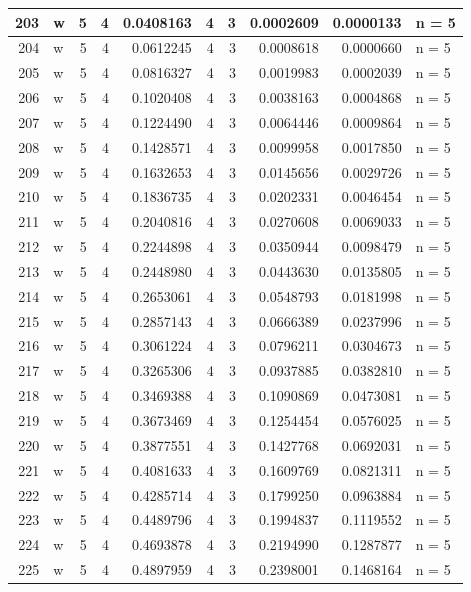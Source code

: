 \documentclass[
  letterpaper,
  DIV=11,
  numbers=noendperiod]{scrreprt}
\begin{document}
\begin{table}
\begin{tabular}[t]{r|l|r|r|r|r|r|r|r|l}
\hline
203 & w & 5 & 4 & 0.0408163 & 4 & 3 & 0.0002609 & 0.0000133 & n = 5\\
\hline
204 & w & 5 & 4 & 0.0612245 & 4 & 3 & 0.0008618 & 0.0000660 & n = 5\\
\hline
205 & w & 5 & 4 & 0.0816327 & 4 & 3 & 0.0019983 & 0.0002039 & n = 5\\
\hline
206 & w & 5 & 4 & 0.1020408 & 4 & 3 & 0.0038163 & 0.0004868 & n = 5\\
\hline
207 & w & 5 & 4 & 0.1224490 & 4 & 3 & 0.0064446 & 0.0009864 & n = 5\\
\hline
208 & w & 5 & 4 & 0.1428571 & 4 & 3 & 0.0099958 & 0.0017850 & n = 5\\
\hline
209 & w & 5 & 4 & 0.1632653 & 4 & 3 & 0.0145656 & 0.0029726 & n = 5\\
\hline
210 & w & 5 & 4 & 0.1836735 & 4 & 3 & 0.0202331 & 0.0046454 & n = 5\\
\hline
211 & w & 5 & 4 & 0.2040816 & 4 & 3 & 0.0270608 & 0.0069033 & n = 5\\
\hline
212 & w & 5 & 4 & 0.2244898 & 4 & 3 & 0.0350944 & 0.0098479 & n = 5\\
\hline
213 & w & 5 & 4 & 0.2448980 & 4 & 3 & 0.0443630 & 0.0135805 & n = 5\\
\hline
214 & w & 5 & 4 & 0.2653061 & 4 & 3 & 0.0548793 & 0.0181998 & n = 5\\
\hline
215 & w & 5 & 4 & 0.2857143 & 4 & 3 & 0.0666389 & 0.0237996 & n = 5\\
\hline
216 & w & 5 & 4 & 0.3061224 & 4 & 3 & 0.0796211 & 0.0304673 & n = 5\\
\hline
217 & w & 5 & 4 & 0.3265306 & 4 & 3 & 0.0937885 & 0.0382810 & n = 5\\
\hline
218 & w & 5 & 4 & 0.3469388 & 4 & 3 & 0.1090869 & 0.0473081 & n = 5\\
\hline
219 & w & 5 & 4 & 0.3673469 & 4 & 3 & 0.1254454 & 0.0576025 & n = 5\\
\hline
220 & w & 5 & 4 & 0.3877551 & 4 & 3 & 0.1427768 & 0.0692031 & n = 5\\
\hline
221 & w & 5 & 4 & 0.4081633 & 4 & 3 & 0.1609769 & 0.0821311 & n = 5\\
\hline
222 & w & 5 & 4 & 0.4285714 & 4 & 3 & 0.1799250 & 0.0963884 & n = 5\\
\hline
223 & w & 5 & 4 & 0.4489796 & 4 & 3 & 0.1994837 & 0.1119552 & n = 5\\
\hline
224 & w & 5 & 4 & 0.4693878 & 4 & 3 & 0.2194990 & 0.1287877 & n = 5\\
\hline
225 & w & 5 & 4 & 0.4897959 & 4 & 3 & 0.2398001 & 0.1468164 & n = 5\\

\end{tabular}
\end{table}
\end{document}
